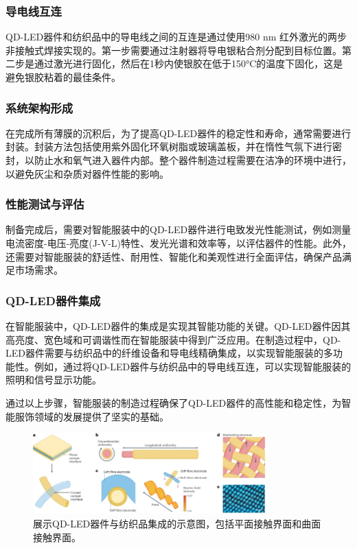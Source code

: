 \documentclass[12pt,hyperref,a4paper,UTF8]{ctexart}
\begin{document}
\subsubsection*{导电线互连}
QD-LED器件和纺织品中的导电线之间的互连是通过使用980 nm 红外激光的两步非接触式焊接实现的。第一步需要通过注射器将导电银粘合剂分配到目标位置。第二步是通过激光进行固化，然后在1秒内使银胶在低于150°C的温度下固化，这是避免银胶粘着的最佳条件。

\subsubsection*{系统架构形成}
在完成所有薄膜的沉积后，为了提高QD-LED器件的稳定性和寿命，通常需要进行封装。封装方法包括使用紫外固化环氧树脂或玻璃盖板，并在惰性气氛下进行密封，以防止水和氧气进入器件内部。整个器件制造过程需要在洁净的环境中进行，以避免灰尘和杂质对器件性能的影响。

\subsubsection*{性能测试与评估}
制备完成后，需要对智能服装中的QD-LED器件进行电致发光性能测试，例如测量电流密度-电压-亮度(J-V-L)特性、发光光谱和效率等，以评估器件的性能。此外，还需要对智能服装的舒适性、耐用性、智能化和美观性进行全面评估，确保产品满足市场需求。

\subsubsection*{QD-LED器件集成}
在智能服装中，QD-LED器件的集成是实现其智能功能的关键。QD-LED器件因其高亮度、宽色域和可调谐性而在智能服装中得到广泛应用。在制造过程中，QD-LED器件需要与纺织品中的纤维设备和导电线精确集成，以实现智能服装的多功能性。例如，通过将QD-LED器件与纺织品中的导电线互连，可以实现智能服装的照明和信号显示功能。

通过以上步骤，智能服装的制造过程确保了QD-LED器件的高性能和稳定性，为智能服饰领域的发展提供了坚实的基础。
\begin{figure}[H]
  \centering
  \includegraphics[width=0.8\textwidth]{figures/fig/image13.png} 
  \caption{展示QD-LED器件与纺织品集成的示意图，包括平面接触界面和曲面接触界面。\cite{wang2024towards}}
  \label{fig:qd_led_integration}
\end{figure}
\end{document}
